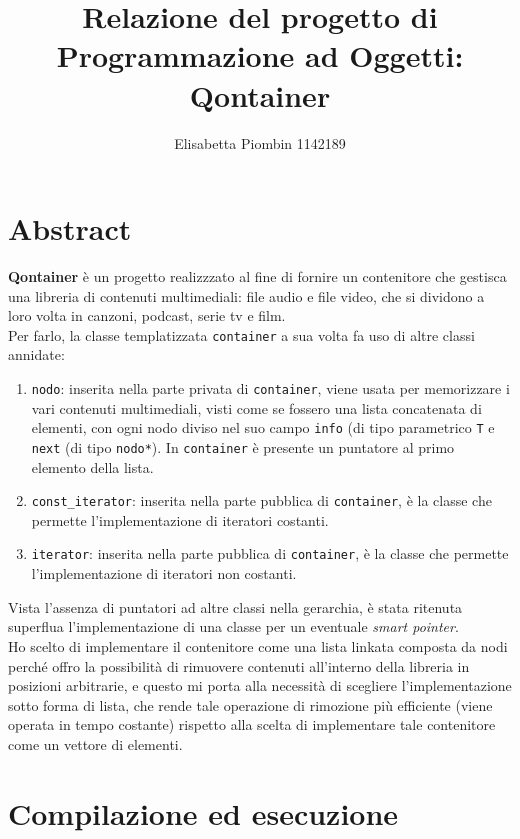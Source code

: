 \documentclass[a4paper,10pt]{article}
\begin{document}
\title {Relazione del progetto di Programmazione ad Oggetti: Qontainer}
\author {Elisabetta Piombin 1142189}
\date{}

\maketitle
\clearpage
\tableofcontents
\clearpage\mbox{}

\section{Abstract}
\textbf{Qontainer} è un progetto realizzzato al fine di fornire un contenitore che gestisca una libreria di contenuti multimediali: file audio e file video, che si dividono a loro volta in canzoni, podcast, serie tv e film. \\
Per farlo, la classe templatizzata \texttt{container} a sua volta fa uso di altre classi annidate:
\begin{enumerate}
\item \texttt{nodo}: inserita nella parte privata di \texttt{container}, viene usata per memorizzare i vari contenuti multimediali, visti come se fossero una lista concatenata di elementi, con ogni nodo diviso nel suo campo \texttt{info} (di tipo parametrico \texttt{T} e \texttt{next} (di tipo \texttt{nodo*}). In \texttt{container} è presente un puntatore al primo elemento della lista.
\item \texttt{const\_iterator}: inserita nella parte pubblica di \texttt{container}, è la classe che permette l'implementazione di iteratori costanti.
\item \texttt{iterator}: inserita nella parte pubblica di \texttt{container}, è la classe che permette l'implementazione di iteratori non costanti.
\end{enumerate}
Vista l'assenza di puntatori ad altre classi nella gerarchia, è stata ritenuta superflua l'implementazione di una classe per un eventuale \textit{smart pointer}.\\
Ho scelto di implementare il contenitore come una lista linkata composta da nodi perché offro la possibilità di rimuovere contenuti all'interno della libreria in posizioni arbitrarie, e questo mi porta alla necessità di scegliere l'implementazione sotto forma di lista, che rende tale operazione di rimozione più efficiente (viene operata in tempo costante) rispetto alla scelta di implementare tale contenitore come un vettore di elementi.

\section{Compilazione ed esecuzione} 
\end{document}
